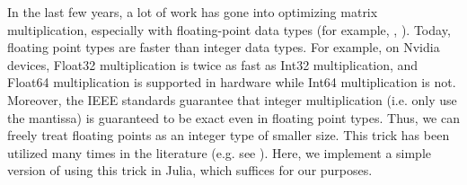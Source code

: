 





In the last few years, a lot of work has gone into optimizing matrix multiplication,
especially with floating-point data types
(for example, \cite{nvidia-2024-cublas}, \cite{openblas-2024-openblas}). 
Today, floating point types are faster than
integer data types.
For example, on Nvidia devices, Float32 multiplication
is twice as fast as Int32 multiplication, and Float64
multiplication is supported in hardware while Int64 multiplication
is not.
Moreover, the IEEE standards guarantee that integer multiplication (i.e. only use the mantissa) 
is guaranteed to be exact even in floating point types. 
Thus, we can freely treat floating points as an integer type of smaller size.
This trick has been utilized many times in the literature (e.g. see \cite{bglm-2024-matmul-modp}).
Here, we implement a simple version of using this trick in Julia,
which suffices for our purposes.

